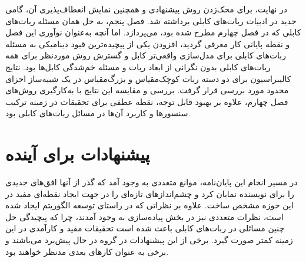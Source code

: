 در نهایت، برای محک‌زدن روش پیشنهادی و همچنین نمایش انعطاف‌پذیری آن، گامی جدید در ادبیات ربات‌های کابلی برداشته شد. فصل پنجم، به حل همان مسئله ربات‌های کابلی که در فصل چهارم مطرح شده بود، می‌پردازد. اما آنچه به‌عنوان نوآوری این فصل و نقطه پایانی کار معرفی گردید، افزودن یکی از پیچیده‌ترین قیود دینامیکی به مسئله ربات‌های کابلی برای مدل‌سازی واقعی‌تر کابل و گسترش روش موردنظر برای همه ربات‌های کابلی بدون نگرانی از ابعاد ربات و مسئله خم‌شدگی کابل‌ها بود. نتایج کالیبراسیون برای دو دسته ربات کوچک‌مقیاس و بزرگ‌مقیاس در یک شبیه‌ساز اجزای محدود مورد بررسی قرار گرفت. بررسی  و مقایسه این نتایج با به‌کارگیری روش‌های فصل چهارم، علاوه بر بهبود قابل توجه، نقطه عطفی برای تحقیقات در زمینه ترکیب سنسورها و کاربرد آن‌ها در مسائل ربات‌های کابلی بود.

\section{پیشنهادات برای آینده}

در مسیر انجام این پایان‌نامه، موانع متعددی به وجود آمد که گذر از آنها افق‌های جدیدی را برای نویسنده نمایان کرد و چشم‌اندازهای تازه‌ای را در جهت ایجاد نقطه‌ای مفید در این حوزه مشخص ساخت. علاوه بر نظراتی که در راستای توسعه الگوریتم ایجاد شده است، نظرات متعددی نیز در بخش پیاده‌سازی به وجود آمدند، چرا که پیچیدگی حل چنین مسائلی در ربات‌های کابلی باعث شده است تحقیقات مفید و کارآمدی در این زمینه کمتر صورت گیرد. برخی از این پیشنهادات در گروه در حال پیش‌برد می‌باشند و برخی به عنوان کار‌های بعدی مدنظر خواهند بود. 

